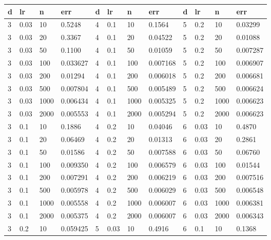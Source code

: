 \begin{table}[h!]
    \centering
    \begin{tabular}{|l|l|l|l||l|l|l|l||l|l|l|l|}
        \hline
        d & lr   & n    & err      & d  & lr   & n    & err      & d & lr   & n    & err      \\ \hline
        3 & 0.03 & 10   & 0.5248   &  4 & 0.1  & 10   & 0.1564   & 5 & 0.2  & 10   & 0.03299  \\
        3 & 0.03 & 20   & 0.3367   &  4 & 0.1  & 20   & 0.04522  & 5 & 0.2  & 20   & 0.01088  \\
        3 & 0.03 & 50   & 0.1100   &  4 & 0.1  & 50   & 0.01059  & 5 & 0.2  & 50   & 0.007287 \\
        3 & 0.03 & 100  & 0.033627 &  4 & 0.1  & 100  & 0.007168 & 5 & 0.2  & 100  & 0.006907 \\
        3 & 0.03 & 200  & 0.01294  &  4 & 0.1  & 200  & 0.006018 & 5 & 0.2  & 200  & 0.006681 \\
        3 & 0.03 & 500  & 0.007804 &  4 & 0.1  & 500  & 0.005489 & 5 & 0.2  & 500  & 0.006624 \\
        3 & 0.03 & 1000 & 0.006434 &  4 & 0.1  & 1000 & 0.005325 & 5 & 0.2  & 1000 & 0.006623 \\
        3 & 0.03 & 2000 & 0.005553 &  4 & 0.1  & 2000 & 0.005294 & 5 & 0.2  & 2000 & 0.006623 \\
        3 & 0.1  & 10   & 0.1886   &  4 & 0.2  & 10   & 0.04046  & 6 & 0.03 & 10   & 0.4870   \\
        3 & 0.1  & 20   & 0.06469  &  4 & 0.2  & 20   & 0.01313  & 6 & 0.03 & 20   & 0.2861   \\
        3 & 0.1  & 50   & 0.01586  &  4 & 0.2  & 50   & 0.007588 & 6 & 0.03 & 50   & 0.06760  \\
        3 & 0.1  & 100  & 0.009350 &  4 & 0.2  & 100  & 0.006579 & 6 & 0.03 & 100  & 0.01544  \\
        3 & 0.1  & 200  & 0.007291 &  4 & 0.2  & 200  & 0.006219 & 6 & 0.03 & 200  & 0.007516 \\
        3 & 0.1  & 500  & 0.005978 &  4 & 0.2  & 500  & 0.006029 & 6 & 0.03 & 500  & 0.006548 \\
        3 & 0.1  & 1000 & 0.005558 &  4 & 0.2  & 1000 & 0.006007 & 6 & 0.03 & 1000 & 0.006381 \\
        3 & 0.1  & 2000 & 0.005375 &  4 & 0.2  & 2000 & 0.006007 & 6 & 0.03 & 2000 & 0.006343 \\
        3 & 0.2  & 10   & 0.059425 &  5 & 0.03 & 10   & 0.4916   & 6 & 0.1  & 10   & 0.1368   \\

\end{tabular}
\end{table}
